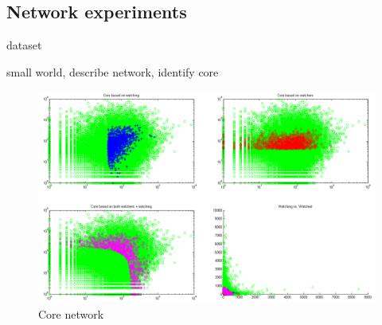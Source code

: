 \subsection{Network experiments}
dataset

small world, describe network, identify core

\begin{figure}[htb]
  \centering
  \includegraphics[width=1\linewidth]{img/core.png}
  \caption{Core network}
  \label{fig:results_core}
\end{figure}